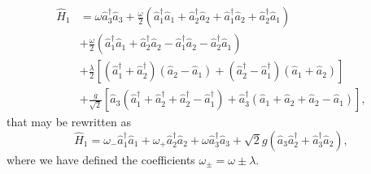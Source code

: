 \documentclass{article}
\newcommand{\op}[1]{\hat{#1}}
\begin{document}
\begin{align*}
    \op{H}_{1} &= \omega \op{a}_{3}^{\dagger}\op{a}_{3} + \frac{\omega}{2}\left(\op{a}_{1}^{\dagger}\op{a}_{1} + \op{a}_{2}^{\dagger}\op{a}_{2} + \op{a}_{1}^{\dagger}\op{a}_{2} + \op{a}_{2}^{\dagger}\op{a}_{1}\right)\\
    &+ \frac{\omega}{2}\left(\op{a}_{1}^{\dagger}\op{a}_{1} + \op{a}_{2}^{\dagger}\op{a}_{2} - \op{a}_{1}^{\dagger}\op{a}_{2} - \op{a}_{2}^{\dagger}\op{a}_{1}\right)\\ 
    &+ \frac{\lambda}{2} \left[\left(\op{a}_{1}^{\dagger} + \op{a}_{2}^{\dagger}\right)\left(\op{a}_{2} - \op{a}_{1}\right) + \left(\op{a}_{2}^{\dagger} - \op{a}_{1}^{\dagger}\right)\left(\op{a}_{1} + \op{a}_{2}\right)\right]\\
    &+ \frac{g}{\sqrt{2}}\left[\op{a}_{3}\left(\op{a}_{1}^{\dagger} + \op{a}_{2}^{\dagger} + \op{a}_{2}^{\dagger} - \op{a}_{1}^{\dagger}\right) + \op{a}_{3}^{\dagger}\left(\op{a}_{1}+\op{a}_{2}+\op{a}_{2}-\op{a}_{1}\right)\right],
\end{align*}
that may be rewritten as
\begin{equation}\label{H1}
    \op{H}_{1} = \omega_{-}\op{a}_{1}^{\dagger}\op{a}_{1} + \omega_{+}\op{a}_{2}^{\dagger}\op{a}_{2} + \omega \op{a}_{3}^{\dagger}\op{a}_{3}  + {\sqrt{2}} g\left(\op{a}_{3}\op{a}_{2}^{\dagger} + \op{a}_{3}^{\dagger}\op{a}_{2}\right),
\end{equation}
where we have defined the coefficients $\omega_{\pm} = \omega \pm \lambda$.
\end{document}
